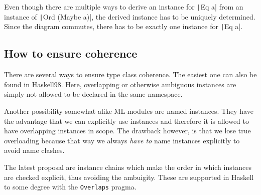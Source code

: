 
Even though there are multiple ways to derive an instance for \texttt|Eq a| from an instance of \texttt|Ord (Maybe a)|, the derived instance has to be uniquely determined.
Since the diagram commutes, there has to be exactly one instance for \texttt|Eq a|.

\subsection{How to ensure coherence}

There are several ways to ensure type class coherence.
The easiest one can also be found in Haskell98.
Here, overlapping or otherwise ambiguous instances are simply not allowed to be declared in the same namespace.

Another possibility somewhat alike ML-modules are named instances.
They have the advantage that we can explicitly use instances and therefore it is allowed to have overlapping instances in scope.
The drawback however, is that we lose true overloading because that way we always \emph{have to} name instances explicitly to avoid name clashes.

The latest proposal are instance chains which make the order in which instances are checked explicit, thus avoiding the ambuigity. \cite{morris2010instance}
These are supported in Haskell to some degree with the \texttt{Overlaps} pragma.
